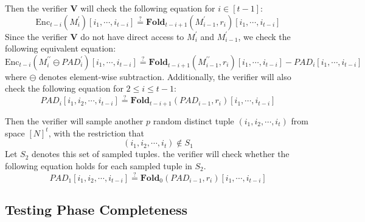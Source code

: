 \begin{enumerate}
    Then the verifier $\textbf{V}$ will check the following equation for $i \in [t-1]$:
$$
    \text{Enc}_{t-i}(M_i^\prime)[i_1, \cdots, i_{t-i}] \stackrel{?}{=} \textbf{Fold}_{t-i+1}(M_{i-1}^\prime, r_i) [i_1, \cdots, i_{t-i}]
$$
Since the verifier $\textbf{V}$ do not have direct access to $M_i^\prime$ and $M_{i-1}^\prime$, we check the following equivalent equation:
\begin{equation}
\label{eq:szkpctc_eq}
    \text{Enc}_{t-i}(M_i^{\prime\prime} \ominus PAD_{i}^\prime)[i_1, \cdots, i_{t-i}] 
    \stackrel{?}{=}
    \textbf{Fold}_{t-i+1}(M_{i-1}^{\prime\prime}, r_i) [i_1, \cdots, i_{t-i}] - PAD_i[i_1, \cdots, i_{t-i}]
\end{equation}
where $\ominus$ denotes element-wise subtraction.
Additionally, the verifier will also check the following equation for $2 \le i \le t-1$:
\begin{equation}
\label{eq:szkpctc_eq2}
    PAD_i[i_1, i_2, \cdots, i_{t-i}] 
    \stackrel{?}{=}
    \textbf{Fold}_{t-i+1}(PAD_{i-1}, r_i) [i_1, \cdots, i_{t-i}]
\end{equation}

Then the verifier will sample another $p$ random distinct tuple $(i_1, i_2, \cdots, i_t)$ from space $[N]^t$, with the restriction that 
$$(i_1, i_2, \cdots, i_t) \not\in S_1$$ 
Let $S_2$ denotes this set of sampled tuples. the verifier will check whether the following equation holds for each sampled tuple in $S_2$.
$$
    PAD_1[i_1, i_2, \cdots, i_{t-i}] 
    \stackrel{?}{=}
    \textbf{Fold}_{0}(PAD_{i-1}, r_i) [i_1, \cdots, i_{t-i}]
$$

\end{enumerate}

\subsection{Testing Phase Completeness}

